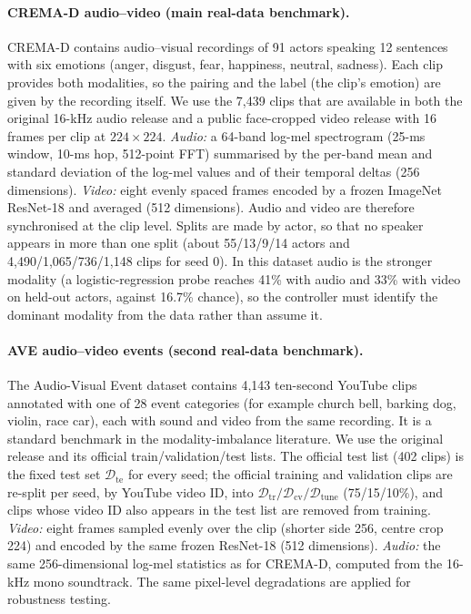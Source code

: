 \documentclass[fleqn,10pt]{wlscirep}
\begin{document}
\paragraph{CREMA-D audio--video (main real-data benchmark).} CREMA-D\cite{cao2014crema} contains audio--visual recordings of 91 actors speaking 12 sentences with six emotions (anger, disgust, fear, happiness, neutral, sadness). Each clip provides both modalities, so the pairing and the label (the clip's emotion) are given by the recording itself. We use the 7,439 clips that are available in both the original 16-kHz audio release and a public face-cropped video release with 16 frames per clip at $224{\times}224$. \emph{Audio:} a 64-band log-mel spectrogram (25-ms window, 10-ms hop, 512-point FFT) summarised by the per-band mean and standard deviation of the log-mel values and of their temporal deltas (256 dimensions). \emph{Video:} eight evenly spaced frames encoded by a frozen ImageNet ResNet-18\cite{he2016deep} and averaged (512 dimensions). Audio and video are therefore synchronised at the clip level. Splits are made by actor, so that no speaker appears in more than one split (about 55/13/9/14 actors and 4,490/1,065/736/1,148 clips for seed 0). In this dataset audio is the stronger modality (a logistic-regression probe reaches 41\% with audio and 33\% with video on held-out actors, against 16.7\% chance), so the controller must identify the dominant modality from the data rather than assume it.

\paragraph{AVE audio--video events (second real-data benchmark).} The Audio-Visual Event dataset\cite{tian2018audio} contains 4,143 ten-second YouTube clips annotated with one of 28 event categories (for example church bell, barking dog, violin, race car), each with sound and video from the same recording. It is a standard benchmark in the modality-imbalance literature\cite{peng2022balanced,li2023boosting,wei2024mmpareto}. We use the original release and its official train/validation/test lists. The official test list (402 clips) is the fixed test set $\mathcal{D}_{\mathrm{te}}$ for every seed; the official training and validation clips are re-split per seed, by YouTube video ID, into $\mathcal{D}_{\mathrm{tr}}/\mathcal{D}_{\mathrm{cv}}/\mathcal{D}_{\mathrm{tune}}$ (75/15/10\%), and clips whose video ID also appears in the test list are removed from training. \emph{Video:} eight frames sampled evenly over the clip (shorter side 256, centre crop 224) and encoded by the same frozen ResNet-18 (512 dimensions). \emph{Audio:} the same 256-dimensional log-mel statistics as for CREMA-D, computed from the 16-kHz mono soundtrack. The same pixel-level degradations are applied for robustness testing.
\end{document}
